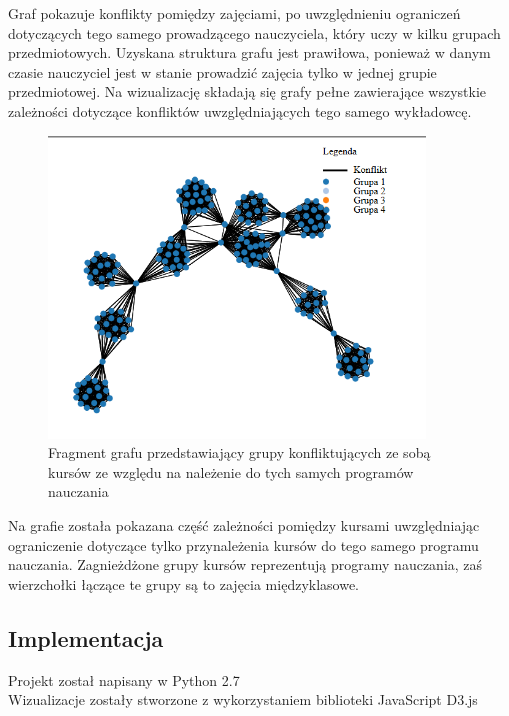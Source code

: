 \par Graf pokazuje konflikty pomiędzy zajęciami, po uwzględnieniu ograniczeń dotyczących tego samego prowadzącego nauczyciela, który uczy w kilku grupach przedmiotowych. Uzyskana struktura grafu jest prawiłowa, ponieważ w danym czasie nauczyciel jest w stanie prowadzić zajęcia tylko w jednej grupie przedmiotowej. Na wizualizację składają się grafy pełne zawierające wszystkie zależności dotyczące konfliktów uwzględniających tego samego wykładowcę.
\begin{figure}[H]
  \centering
   \caption{Fragment grafu przedstawiający grupy konfliktujących ze sobą kursów ze względu na należenie do tych samych programów nauczania}
   \includegraphics[width=10cm]{fragmentszkola.PNG}
\end{figure}
\par Na grafie została pokazana część zależności pomiędzy kursami uwzględniając ograniczenie dotyczące tylko przynależenia kursów do tego samego programu nauczania. Zagnieżdżone grupy kursów reprezentują programy nauczania, zaś wierzchołki łączące te grupy są to zajęcia międzyklasowe.

\subsection{Implementacja}
Projekt został napisany w Python 2.7 \\
Wizualizacje zostały stworzone z wykorzystaniem biblioteki JavaScript D3.js \cite{wiz}
